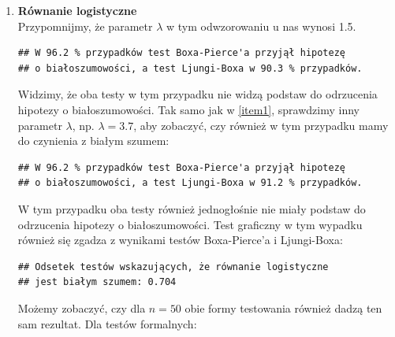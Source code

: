 \documentclass[10pt, a4paper]{article}\usepackage[]{graphicx}\usepackage[]{xcolor}
\makeatletter
\newenvironment{kframe}{%
 \def\at@end@of@kframe{}%
 \ifinner\ifhmode%
  \def\at@end@of@kframe{\end{minipage}}%
  \begin{minipage}{\columnwidth}%
 \fi\fi%
 \def\FrameCommand##1{\hskip\@totalleftmargin \hskip-\fboxsep
 \colorbox{shadecolor}{##1}\hskip-\fboxsep
     \hskip-\linewidth \hskip-\@totalleftmargin \hskip\columnwidth}%
 \MakeFramed {\advance\hsize-\width
   \@totalleftmargin\z@ \linewidth\hsize
   \@setminipage}}%
 {\par\unskip\endMakeFramed%
 \at@end@of@kframe}
\newenvironment{knitrout}{}{} %
\newtheorem{wn}{Wniosek}
\makeatother
\begin{document}
\begin{enumerate}
\begin{wn}{Model ruchomej średniej rzędu 1 z parametrem $\theta=0.1$ jest białym szumem.} \end{wn}
\begin{wn}{Model ruchomej średniej rzędu 1 z parametrem $\theta=0.5$ nie jest białym szumem.} \end{wn}
\item \textbf{Równanie logistyczne}\\
Przypomnijmy, że parametr $\lambda$ w tym odwzorowaniu u nas wynosi 1.5.
\begin{knitrout}
\color{fgcolor}\begin{kframe}
\begin{verbatim}
## W 96.2 % przypadków test Boxa-Pierce'a przyjął hipotezę 
## o białoszumowości, a test Ljungi-Boxa w 90.3 % przypadków.
\end{verbatim}
\end{kframe}
\end{knitrout}
Widzimy, że oba testy w tym przypadku nie widzą podstaw do odrzucenia hipotezy o białoszumowości. Tak samo jak w \ref{item1}, sprawdzimy inny parametr $\lambda$, np. $\lambda=3.7$, aby zobaczyć, czy również w tym przypadku mamy do czynienia z białym szumem:
\begin{knitrout}
\color{fgcolor}\begin{kframe}
\begin{verbatim}
## W 96.2 % przypadków test Boxa-Pierce'a przyjął hipotezę 
## o białoszumowości, a test Ljungi-Boxa w 91.2 % przypadków.
\end{verbatim}
\end{kframe}
\end{knitrout}
W tym przypadku oba testy również jednogłośnie nie miały podstaw do odrzucenia hipotezy o białoszumowości. Test graficzny w tym wypadku również się zgadza z wynikami testów Boxa-Pierce'a i Ljungi-Boxa:
\begin{knitrout}
\color{fgcolor}\begin{kframe}
\begin{verbatim}
## Odsetek testów wskazujących, że równanie logistyczne
## jest białym szumem: 0.704
\end{verbatim}
\end{kframe}
\end{knitrout}
Możemy zobaczyć, czy dla $n=50$ obie formy testowania również dadzą ten sam rezultat. Dla testów formalnych:

\end{enumerate}
\end{document}
